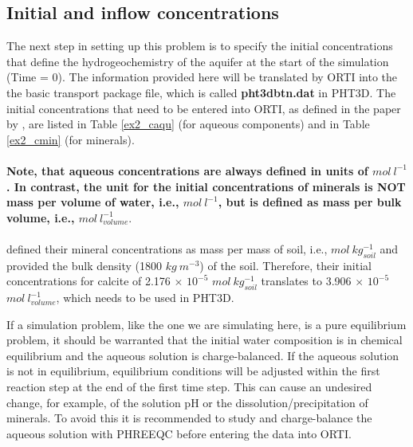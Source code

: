 \subsection[Initial and inflow concentrations]{Initial and inflow concentrations}

The next step in setting up this problem is to specify the initial concentrations
that define the hydrogeochemistry of the aquifer at the start of the simulation (Time = 0).
The information provided here will be translated by ORTI into the 
the basic transport package file, which is called  {\color{red} \textbf{pht3dbtn.dat}}
in PHT3D. The initial concentrations that need to be entered into ORTI,
as defined in the paper by \cite{enges92}, are listed in
Table \ref{ex2_caqu} (for aqueous components) and in Table \ref{ex2_cmin} (for minerals).
\\
\ \\
\textbf{Note, that aqueous concentrations are always defined in units of $mol\ l^{-1}$.
In contrast, the unit for the initial concentrations of minerals
is NOT mass per volume of water, i.e., $mol\ l^{-1}$,
but is defined as mass per bulk volume, i.e., $mol\ l^{-1}_{volume}$}. \\
\ \\
\cite{enges92} defined their mineral concentrations as mass per
mass of soil, i.e., $mol\ kg_{soil}^{-1}$ and provided the bulk
density (1800 $kg\ m^{-3}$) of the soil. Therefore, their initial
concentrations for calcite of 2.176 $\times$ $10^{-5}$ $mol\
kg_{soil}^{-1}$ translates to 3.906 $\times$ $10^{-5}$ $mol\
l^{-1}_{volume}$, which needs to be used in PHT3D.
\par If a simulation problem, like the one we are 
simulating here, is a pure equilibrium problem, it should
be warranted that the initial water composition is in chemical equilibrium
and the aqueous solution is charge-balanced. 
If the aqueous solution is not in equilibrium, equilibrium conditions
will be adjusted within the first reaction step at the end of the
first time step. This can cause an undesired change, for example,
of the solution pH or the dissolution/precipitation of minerals. 
To avoid this it is recommended to study and
charge-balance the aqueous solution with PHREEQC before entering
the data into ORTI.


